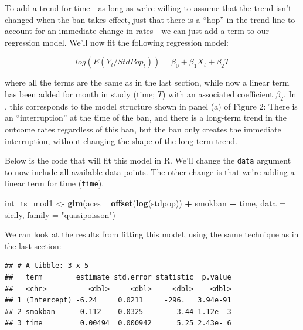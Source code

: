 \documentclass[
]{book}
\newenvironment{Shaded}{\begin{snugshade}}{\end{snugshade}}
\newcommand{\DataTypeTok}[1]{\textcolor[rgb]{0.13,0.29,0.53}{#1}}
\newcommand{\KeywordTok}[1]{\textcolor[rgb]{0.13,0.29,0.53}{\textbf{#1}}}
\newcommand{\NormalTok}[1]{#1}
\newcommand{\OperatorTok}[1]{\textcolor[rgb]{0.81,0.36,0.00}{\textbf{#1}}}
\newcommand{\StringTok}[1]{\textcolor[rgb]{0.31,0.60,0.02}{#1}}
\begin{document}
To add a trend for time---as long as we're willing to assume that the trend isn't changed when the ban takes effect, just that there is a ``hop'' in the trend line to account for an immediate change in rates---we can just add a term to our regression model. We'll now fit the following regression model:

\[
log(E(Y_t/StdPop_t)) = \beta_0 + \beta_1 X_t + \beta_2 T
\]

where all the terms are the same as in the last section, while now a linear term has been added for month in study (time; \(T\)) with an associated coefficient \(\beta_2\). In \citet{bernal2017interrupted}, this corresponds to the model structure shown in panel (a) of Figure 2: There is an ``interruption'' at the time of the ban, and there is a long-term trend in the outcome rates regardless of this ban, but the ban only creates the immediate interruption, without changing the shape of the long-term trend.

Below is the code that will fit this model in R. We'll change the \texttt{data} argument to now include all available data points. The other change is that we're adding a linear term for time (\texttt{time}).

\begin{Shaded}
\begin{Highlighting}[]
\NormalTok{int_ts_mod1 <-}\StringTok{ }\KeywordTok{glm}\NormalTok{(aces }\OperatorTok{~}\StringTok{ }\KeywordTok{offset}\NormalTok{(}\KeywordTok{log}\NormalTok{(stdpop)) }\OperatorTok{+}\StringTok{ }\NormalTok{smokban }\OperatorTok{+}\StringTok{ }\NormalTok{time, }
                      \DataTypeTok{data =}\NormalTok{ sicily, }
                      \DataTypeTok{family =} \StringTok{"quasipoisson"}\NormalTok{)}
\end{Highlighting}
\end{Shaded}

We can look at the results from fitting this model, using the same technique as in the last section:

\begin{Shaded}
\end{Shaded}

\begin{verbatim}
## # A tibble: 3 x 5
##   term        estimate std.error statistic  p.value
##   <chr>          <dbl>     <dbl>     <dbl>    <dbl>
## 1 (Intercept) -6.24     0.0211     -296.   3.94e-91
## 2 smokban     -0.112    0.0325       -3.44 1.12e- 3
## 3 time         0.00494  0.000942      5.25 2.43e- 6
\end{verbatim}
\end{document}
